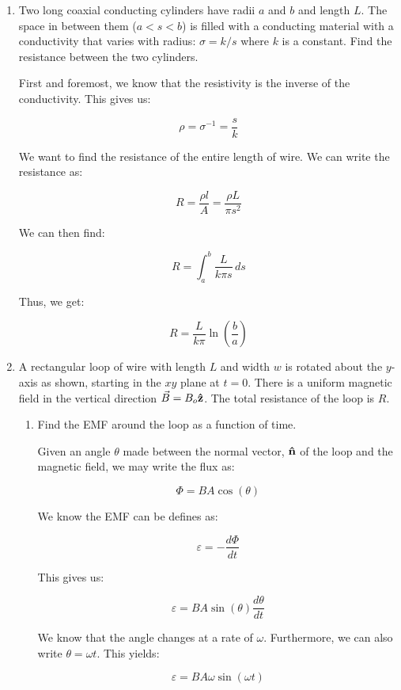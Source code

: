 \begin{enumerate}

  \item Two long coaxial conducting cylinders have radii $a$ and $b$ and length $L$. The space in between them ($a<s<b$) is filled with a conducting material with a conductivity that varies with radius: $\sigma=k/s$ where $k$ is a constant. Find the resistance between the two cylinders.

    First and foremost, we know that the resistivity is the inverse of the conductivity. This gives us:

    $$\rho=\sigma^{-1}=\frac{s}{k}$$

    We want to find the resistance of the entire length of wire. We can write the resistance as:

    $$R=\frac{\rho l}{A}=\frac{\rho L}{\pi s^2}$$

    We can then find:

    $$R=\int_a^b\frac{L}{k\pi s}\,ds$$

    Thus, we get:

    $$\boxed{R=\frac{L}{k\pi}\ln\left( \frac{b}{a} \right)}$$

  \item A rectangular loop of wire with length $L$ and width $w$ is rotated about the $y$-axis as shown, starting in the $xy$ plane at $t = 0$. There is a uniform magnetic field in the vertical direction $\vec{B}=B_o\bold{\hat{z}}$. The total resistance of the loop is $R$.

    \begin{enumerate}

      \item Find the EMF around the loop as a function of time.

        Given an angle $\theta$ made between the normal vector, $\bold{\hat{n}}$ of the loop and the magnetic field, we may write the flux as:

        $$\Phi=BA\cos(\theta)$$

        We know the EMF can be defines as:

        $$\varepsilon=-\frac{d\Phi}{dt}$$

        This gives us:

        $$\varepsilon=BA\sin(\theta)\frac{d\theta}{dt}$$

        We know that the angle changes at a rate of $\omega$. Furthermore, we can also write $\theta=\omega t$. This yields:

        $$\varepsilon=BA\omega\sin(\omega t)$$


\end{enumerate}
\end{enumerate}
